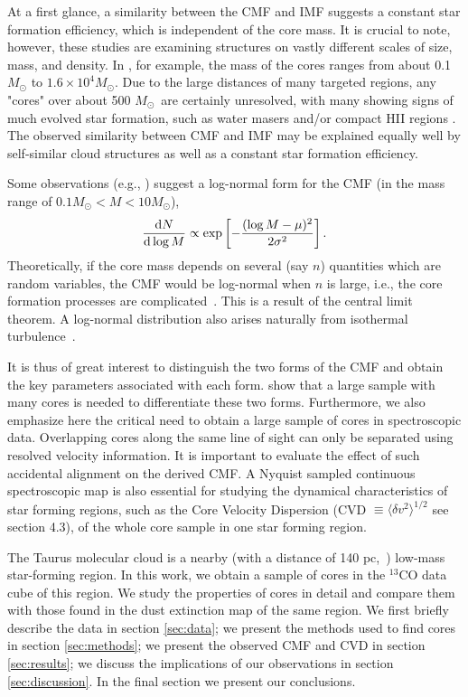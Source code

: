 \documentclass[12pt,preprint]{aastex}
\def\Ms{$M_{\odot}$}
\begin{document}
At a first glance, a similarity between the CMF and IMF suggests a
constant star formation efficiency, which is independent of the core
mass. It is crucial to note, however, these studies are examining
structures on vastly different scales of size, mass, and density. In
\cite{Reid2006}, for example, the mass of the cores ranges from
about 0.1 $M_{\odot}$ to $1.6\times 10^4M_{\odot}$. Due to the large
distances of many targeted regions, any "cores" over about 500 \Ms\ are
certainly unresolved, with many showing signs of much evolved star
formation, such as water masers \citep{Wang2006} and/or compact HII
regions \citep{Hofner2002}. The observed similarity between CMF and IMF
may be explained equally well by self-similar  cloud structures as well as a
constant star formation efficiency.

Some observations (e.g., \cite{observe_lognormal}) suggest a log-normal form for the CMF (in the mass range of $0.1 M_{\odot}<M<10 M_{\odot}$),
\begin{equation}
\frac{{\rm d}N}{{\rm d}\log M} \propto \exp\left[-\frac{(\log M-\mu)^2}{2\sigma^2}\right].
\label{lognormal}
\end{equation}
Theoretically, if the core mass depends on several (say $n$) quantities which are
random variables, the CMF would be log-normal when $n$ is large,
i.e., the core formation processes are complicated~\citep{adams1996}. This is a result
of the central limit theorem. A log-normal distribution  also
arises naturally from isothermal turbulence~\citep{Larson1973}.

It is thus of great interest to distinguish the two forms of the CMF and
obtain the key parameters associated with each form.
\cite{Form_of_CMF} show that a large sample with many cores is needed to differentiate these two forms.
Furthermore, we also emphasize here the critical need to obtain a large sample of cores in spectroscopic data.
Overlapping cores along the same line of sight can only be separated using resolved velocity information.
It is important to evaluate the
effect of such accidental alignment on the derived CMF.
A Nyquist sampled continuous spectroscopic map is also essential for
studying the  dynamical characteristics of star forming regions, such as the Core Velocity Dispersion (CVD $\equiv \langle\delta v^2\rangle^{1/2}$ see section 4.3), of the whole core sample in one star forming region.

The Taurus molecular cloud is a nearby (with a distance of 140 pc,~\cite{Distance}) low-mass
star-forming region. In this work, we obtain a
sample of cores in the $^{13}$CO data cube of this region. We study
the properties of cores in detail and compare them with those found in the
dust extinction map of the same region.  We first
briefly describe the data in section \ref{sec:data}; we present the
methods used to find cores in section
\ref{sec:methods}; we present the observed CMF and CVD in section
\ref{sec:results}; we discuss the implications of our observations in section
\ref{sec:discussion}. In the final section we present our conclusions.
\end{document}
